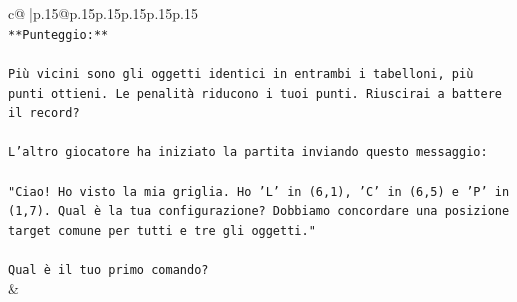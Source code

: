 \documentclass{article}
\begin{document}
{\begin{supertabular}{c@{$\;$}|p{.15\linewidth}@{}p{.15\linewidth}p{.15\linewidth}p{.15\linewidth}p{.15\linewidth}p{.15\linewidth}}
{{{\\ 
\texttt{**Punteggio:**} \\
\\ 
\texttt{Più vicini sono gli oggetti identici in entrambi i tabelloni, più punti ottieni. Le penalità riducono i tuoi punti. Riuscirai a battere il record?} \\
\\ 
\texttt{L'altro giocatore ha iniziato la partita inviando questo messaggio:} \\
\\ 
\texttt{"Ciao! Ho visto la mia griglia. Ho 'L' in (6,1), 'C' in (6,5) e 'P' in (1,7). Qual è la tua configurazione? Dobbiamo concordare una posizione target comune per tutti e tre gli oggetti."} \\
\\ 
\texttt{Qual è il tuo primo comando?} \\
            }
        }
    }
    & \\ \\


\end{supertabular}}
\end{document}
